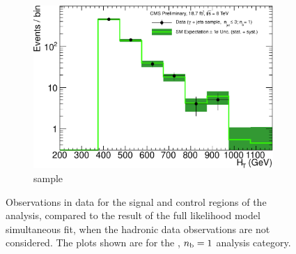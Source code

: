 \begin{figure}[h!]
\begin{subfigure}[b]{0.48\textwidth}
    \includegraphics[width=\textwidth]
    {Figs/results/v0/greenBand/single_plots/photon_1b_le3j_logy.pdf}
    \caption{\gj sample}
  \end{subfigure}
  \caption{Observations in data for the signal and control
  regions of the analysis, compared to the result of the full likelihood model
  simultaneous fit, when the hadronic data observations are not considered. The
  plots shown are for the \njlow, $n_{\text{b}} = 1$ analysis category.}
  \label{fig:green_fits_1b_le3j}
\end{figure}

